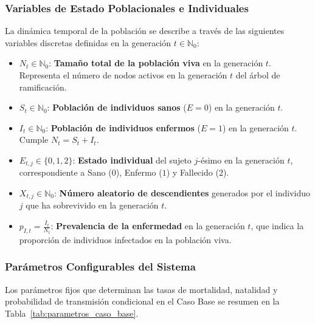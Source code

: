 \documentclass[graybox]{SNmult}
\begin{document}
	\subsubsection{Variables de Estado Poblacionales e Individuales}
	La dinámica temporal de la población se describe a través de las siguientes variables discretas definidas en la generación $t \in \mathbb{N}_0$:
	
	\begin{itemize}
		\item $N_t \in \mathbb{N}_0$: \textbf{Tamaño total de la población viva} en la generación $t$. Representa el número de nodos activos en la generación $t$ del árbol de ramificación.
		\item $S_t \in \mathbb{N}_0$: \textbf{Población de individuos sanos} ($E=0$) en la generación $t$.
		\item $I_t \in \mathbb{N}_0$: \textbf{Población de individuos enfermos} ($E=1$) en la generación $t$. Cumple $N_t = S_t + I_t$.
		\item $E_{t,j} \in \{0, 1, 2\}$: \textbf{Estado individual} del sujeto $j$-ésimo en la generación $t$, correspondiente a Sano ($0$), Enfermo ($1$) y Fallecido ($2$).
		\item $X_{t,j} \in \mathbb{N}_0$: \textbf{Número aleatorio de descendientes} generados por el individuo $j$ que ha sobrevivido en la generación $t$.
		\item $p_{I,t} = \frac{I_t}{N_t}$: \textbf{Prevalencia de la enfermedad} en la generación $t$, que indica la proporción de individuos infectados en la población viva.
	\end{itemize}
	
	\subsubsection{Parámetros Configurables del Sistema}
	Los parámetros fijos que determinan las tasas de mortalidad, natalidad y probabilidad de transmisión condicional en el Caso Base se resumen en la Tabla~\ref{tab:parametros_caso_base}.
	
\end{document}

